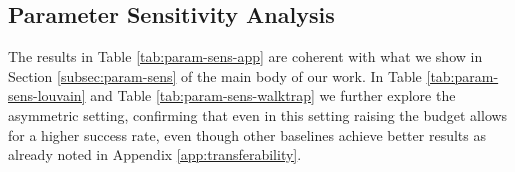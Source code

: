 \subsection{Parameter Sensitivity Analysis}
\label{app:param-sens}
The results in Table \ref{tab:param-sens-app} are coherent with what we show in Section \ref{subsec:param-sens} of the main body of our work. In Table \ref{tab:param-sens-louvain} and Table \ref{tab:param-sens-walktrap} we further explore the asymmetric setting, confirming that even in this setting raising the budget allows for a higher success rate, even though other baselines achieve better results as already noted in Appendix \ref{app:transferability}.

\begin{table}[htpb]
    \centering
    \caption{Impact of budget $\beta$ on Success Rate (SR) in the symmetric setting ($\tau=0.5$) across all datasets.}
    \label{tab:param-sens-app}
\end{table}
